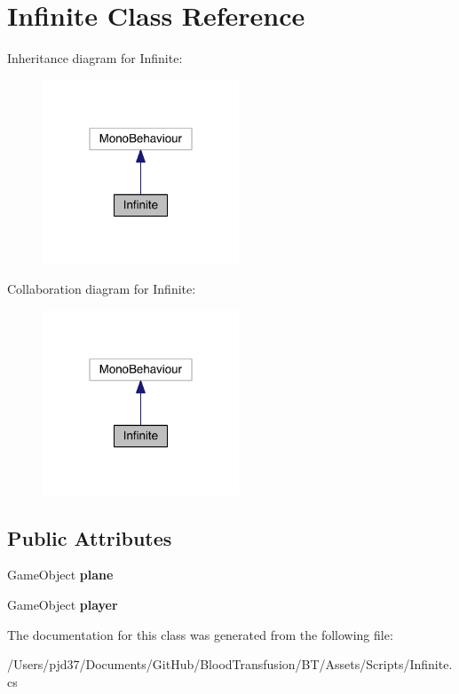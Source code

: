 \hypertarget{class_infinite}{}\section{Infinite Class Reference}
\label{class_infinite}


Inheritance diagram for Infinite\+:\nopagebreak
\begin{figure}[H]
\begin{center}
\leavevmode
\includegraphics[width=166pt]{class_infinite__inherit__graph}
\end{center}
\end{figure}


Collaboration diagram for Infinite\+:\nopagebreak
\begin{figure}[H]
\begin{center}
\leavevmode
\includegraphics[width=166pt]{class_infinite__coll__graph}
\end{center}
\end{figure}
\subsection*{Public Attributes}
\begin{DoxyCompactItemize}
\item 
Game\+Object {\bfseries plane}\hypertarget{class_infinite_ae3d6f1125900ea01a131b440d9d030bc}{}\label{class_infinite_ae3d6f1125900ea01a131b440d9d030bc}

\item 
Game\+Object {\bfseries player}\hypertarget{class_infinite_ad1901967260daca7b5b247fb1c708122}{}\label{class_infinite_ad1901967260daca7b5b247fb1c708122}

\end{DoxyCompactItemize}


The documentation for this class was generated from the following file\+:\begin{DoxyCompactItemize}
\item 
/\+Users/pjd37/\+Documents/\+Git\+Hub/\+Blood\+Transfusion/\+B\+T/\+Assets/\+Scripts/Infinite.\+cs\end{DoxyCompactItemize}
